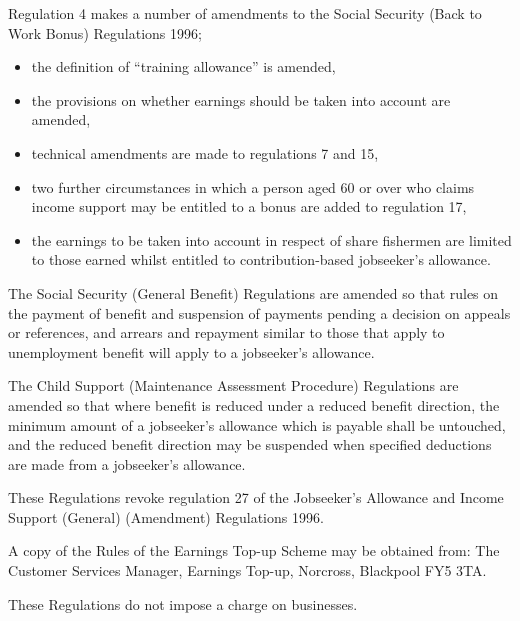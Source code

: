 \documentclass[a4paper]{article}
\begin{document}
  Regulation 4 makes a number of amendments to the Social Security (Back to Work Bonus) Regulations 1996;
\begin{itemize}
\item the definition of “training allowance” is amended,
\item the provisions on whether earnings should be taken into account are amended,
\item technical amendments are made to regulations 7 and 15,
\item two further circumstances in which a person aged 60 or over who claims income support may be entitled to a bonus are added to regulation 17,
\item the earnings to be taken into account in respect of share fishermen are limited to those earned whilst entitled to contribution-based jobseeker’s allowance.
\end{itemize}

  The Social Security (General Benefit) Regulations are amended so that rules on the payment of benefit and suspension of payments pending a decision on appeals or references, and arrears and repayment similar to those that apply to unemployment benefit will apply to a jobseeker’s allowance.

  The Child Support (Maintenance Assessment Procedure) Regulations are amended so that where benefit is reduced under a reduced benefit direction, the minimum amount of a jobseeker’s allowance which is payable shall be untouched, and the reduced benefit direction may be suspended when specified deductions are made from a jobseeker’s allowance.

  These Regulations revoke regulation 27 of the Jobseeker’s Allowance and Income Support (General) (Amendment) Regulations 1996.

  A copy of the Rules of the Earnings Top-up Scheme may be obtained from:
 The Customer Services Manager,
Earnings Top-up,
Norcross,
Blackpool {\scshape FY}5 3TA.

  These Regulations do not impose a charge on businesses.
\end{document}
